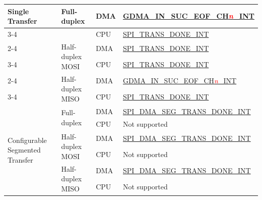 \documentclass[main\_\_EN.tex]{subfiles}
\begin{document}
\begin{ThreePartTable}
\begin{longtable}[c]{|l|l|l|l|}
\multirow{6}{*}{Single Transfer} & \multirow{2}{*}{Full-duplex} & DMA & \hyperref[int:GDMAINSUCEOFINT]{GDMA\_IN\_SUC\_EOF\_CH\textcolor{red}{\it{n}}\_INT} \tnote{1} \\ \cline{3-4}  
&& CPU & \hyperref[int:SPITRANSDONEINT]{SPI\_TRANS\_DONE\_INT} \tnote{2}  \\ \cline{2-4} 
& \multirow{2}{*}{Half-duplex MOSI} & DMA & \hyperref[int:SPITRANSDONEINT]{SPI\_TRANS\_DONE\_INT} \\ \cline{3-4} 
&& CPU & \hyperref[int:SPITRANSDONEINT]{SPI\_TRANS\_DONE\_INT}  \\ \cline{2-4} 
& \multirow{2}{*}{Half-duplex MISO} & DMA & \hyperref[int:GDMAINSUCEOFINT]{GDMA\_IN\_SUC\_EOF\_CH\textcolor{red}{\it{n}}\_INT} \\ \cline{3-4} 
&& CPU & \hyperref[int:SPITRANSDONEINT]{SPI\_TRANS\_DONE\_INT} \\ \hline
\multirow{6}{*}{Configurable Segmented Transfer} & \multirow{2}{*}{Full-duplex} & DMA & \hyperref[int:SPIDMASEGTRANSDONEINT]{SPI\_DMA\_SEG\_TRANS\_DONE\_INT} \tnote{3} \\ \cline{3-4} 
&& CPU & Not supported       \\ \cline{2-4} 
& \multirow{2}{*}{Half-duplex MOSI} & DMA  & \hyperref[int:SPIDMASEGTRANSDONEINT]{SPI\_DMA\_SEG\_TRANS\_DONE\_INT} \\ \cline{3-4} 
&& CPU           & Not supported       \\ \cline{2-4} 
& \multirow{2}{*}{Half-duplex MISO} & DMA & \hyperref[int:SPIDMASEGTRANSDONEINT]{SPI\_DMA\_SEG\_TRANS\_DONE\_INT} \\ \cline{3-4} 
&& CPU & Not supported       \\ \hline
\end{longtable}

\end{ThreePartTable}
\end{document}
